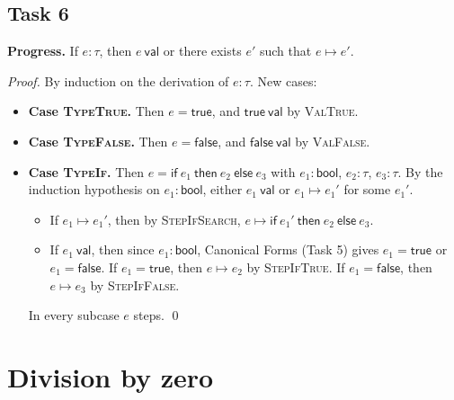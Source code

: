 \documentclass[11pt]{article}
\newcommand{\val}{\ \mathsf{val}}
\newcommand{\step}{\mapsto}
\newcommand{\kw}[1]{\mathsf{#1}}
\newcommand{\tru}{\kw{true}}
\newcommand{\fls}{\kw{false}}
\newcommand{\ite}[3]{\kw{if}\ #1\ \kw{then}\ #2\ \kw{else}\ #3}
\newcommand{\tbool}{\kw{bool}}
\newcommand{\rn}[1]{\textsc{#1}}
\newenvironment{task}[1]{\subsection*{#1}}{}
\begin{document}
\begin{task}{Task 6}
\textbf{Progress.} If $e:\tau$, then $e \val$ or there exists $e'$ such that $e \step e'$.

\emph{Proof.} By induction on the derivation of $e:\tau$. New cases:

\begin{itemize}[leftmargin=*]
\item \textbf{Case \rn{TypeTrue}.} Then $e = \tru$, and $\tru \val$ by \rn{ValTrue}.

\item \textbf{Case \rn{TypeFalse}.} Then $e = \fls$, and $\fls \val$ by \rn{ValFalse}.

\item \textbf{Case \rn{TypeIf}.} Then $e = \ite{e_1}{e_2}{e_3}$ with
  $e_1:\tbool$, $e_2:\tau$, $e_3:\tau$. By the induction hypothesis on $e_1:\tbool$,
  either $e_1 \val$ or $e_1 \step e_1'$ for some $e_1'$.
  \begin{itemize}
  \item If $e_1 \step e_1'$, then by \rn{StepIfSearch},
    $e \step \ite{e_1'}{e_2}{e_3}$.
  \item If $e_1 \val$, then since $e_1 : \tbool$, Canonical Forms (Task 5) gives
    $e_1 = \tru$ or $e_1 = \fls$.
    If $e_1 = \tru$, then $e \step e_2$ by \rn{StepIfTrue}.
    If $e_1 = \fls$, then $e \step e_3$ by \rn{StepIfFalse}.
  \end{itemize}
  In every subcase $e$ steps. \qed
\end{itemize}
\end{task}

\section*{Division by zero}
\end{document}
